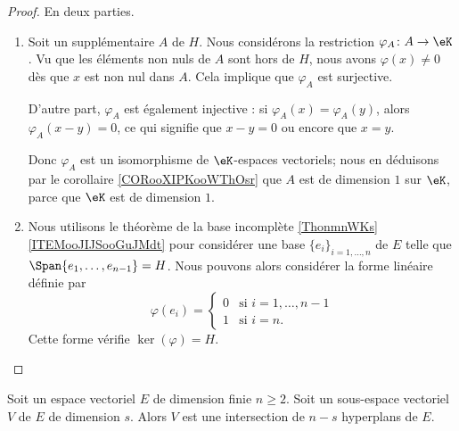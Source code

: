 \begin{proof}
    En deux parties.
    \begin{enumerate}
        \item
            Soit un supplémentaire \( A\) de \( H\). Nous considérons la restriction \( \varphi_A\colon A\to \eK\). Vu que les éléments non nuls de \( A\) sont hors de \( H\), nous avons \( \varphi(x)\neq 0\) dès que \( x\) est non nul dans \( A\). Cela implique que \( \varphi_A\) est surjective.

            D'autre part, \( \varphi_A\) est également injective : si \( \varphi_A(x)=\varphi_A(y)\), alors \( \varphi_A(x-y)=0\), ce qui signifie que \( x-y=0\) ou encore que \( x=y\).

            Donc \( \varphi_A\) est un isomorphisme de \( \eK\)-espaces vectoriels; nous en déduisons par le corollaire \ref{CORooXIPKooWThOsr} que \( A\) est de dimension \( 1\) sur \( \eK\), parce que \( \eK\) est de dimension \( 1\).

        \item
            Nous utilisons le théorème de la base incomplète \ref{ThonmnWKs}\ref{ITEMooJIJSooGuJMdt} pour considérer une base \( \{ e_i \}_{i=1,\ldots, n}\) de \( E\) telle que \( \Span\{ e_1,\ldots, e_{n-1} \}=H\). Nous pouvons alors considérer la forme linéaire définie par
            \begin{equation}
                \varphi(e_i)=\begin{cases}
                    0    &   \text{si }  i=1,\ldots, n-1\\
                    1    &    \text{si } i=n.
                \end{cases}
            \end{equation}
            Cette forme vérifie \( \ker(\varphi)=H\).
    \end{enumerate}
\end{proof}

\begin{proposition}
    Soit un espace vectoriel \( E\) de dimension finie \( n\geq 2\). Soit un sous-espace vectoriel \( V\) de \( E\) de dimension \( s\). Alors \( V\) est une intersection de \( n-s\) hyperplans de \( E\).
\end{proposition}

